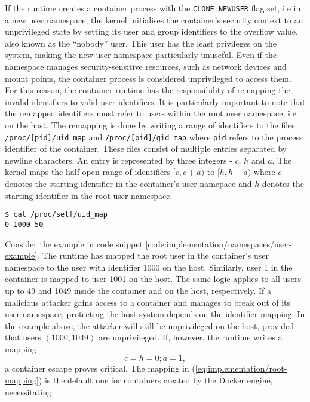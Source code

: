 If the runtime creates a container process with the \verb|CLONE_NEWUSER| flag set, i.e in a new user namespace,
the kernel initialises the container's security context to an unprivileged state by setting its 
user and group identifiers to the overflow value, also known as the \enquote{nobody} user.
This user has the least privileges on the system, making the new user namespace particularly unuseful. 
Even if the namespace manages security-sensitive resources, such as network devices and mount points,
the container process is considered unprivileged to access them. For this reason, the container runtime 
has the responsibility of remapping the invalid identifiers to valid user identifiers. 
It is particularly important to note that the remapped identifiers must refer to users within 
the root user namespace, i.e on the host. The remapping is done by writing a range of 
identifiers to the files \verb|/proc/[pid]/uid_map| and \verb|/proc/[pid]/gid_map| where \verb|pid|
refers to the process identifier of the container.
These files consist of multiple entries separated by newline characters. 
An entry is represented by three integers - $c$, $h$ and $a$. 
The kernel maps the half-open range of identifiers $[c, c+a)$ to $[h, h+a)$ where 
$c$ denotes the starting identifier in the container's user namepace and $h$ denotes 
the starting identifier in the root user namespace.
\begin{lstlisting}[label={code:implementation/namespaces/user-example}, style=bash, caption={Example of an identifier mapping}]
$ cat /proc/self/uid_map
0 1000 50
\end{lstlisting}
Consider the example in code snippet \ref{code:implementation/namespaces/user-example}. The 
runtime has mapped the root user in the container's user namespace to the user with identifier 1000 
on the host. Similarly, user 1 in the container is mapped to user 1001 on the host. The same logic 
applies to all users up to 49 and 1049 inside the container and on the host, respectively. 
If a malicious attacker gains access to a container and manages to break out of its user namespace, 
protecting the host system depends on the identifier mapping. In the example above, the 
attacker will still be unprivileged on the host, provided that users $(1000, 1049)$ are unprivileged.
If, however, the runtime writes a mapping
\begin{equation}
    c = h = 0;  a = 1, \label{eq:implementation/root-mapping}
\end{equation}
a container escape proves critical.
The mapping in (\ref{eq:implementation/root-mapping}) is the default one for containers created by the Docker engine, necessitating
